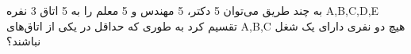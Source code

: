 \p    
به چند طریق می‌توان 5 دکتر، 5 مهندس و 5 معلم را به 5 اتاق 3 نفره A,B,C,D,E
تقسیم کرد به طوری که
حداقل در یکی از اتاق‌های 
A,B,C
هیچ دو نفری دارای یک شغل نباشند؟
